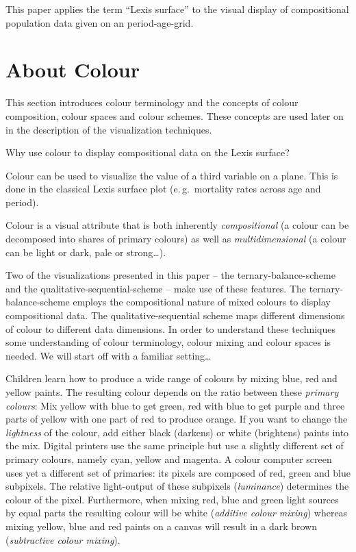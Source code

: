 \documentclass{scrartcl}
\begin{document}
This paper applies the term \enquote{Lexis surface} to the visual display of compositional population data given on an period-age-grid.

\clearpage

\section{About Colour} %
\label{sec:colour}

This section introduces colour terminology and the concepts of colour composition, colour spaces and colour schemes. These concepts are used later on in the description of the visualization techniques.

Why use colour to display compositional data on the Lexis surface?

\begin{compactenum}
  \item Colour can be used to visualize the value of a third variable on a plane. This is done in the classical Lexis surface plot (e.\,g.~mortality rates across age and period).
  \item Colour is a visual attribute that is both inherently \emph{compositional} (a colour can be decomposed into shares of primary colours) as well as \emph{multidimensional} (a colour can be light or dark, pale or strong\ldots).
\end{compactenum}

Two of the visualizations presented in this paper -- the ternary-balance-scheme and the qualitative-sequential-scheme -- make use of these features. The ternary-balance-scheme employs the compositional nature of mixed colours to display compositional data. The qualitative-sequential scheme maps different dimensions of colour to different data dimensions. In order to understand these techniques some understanding of colour terminology, colour mixing and colour spaces is needed. We will start off with a familiar setting\ldots

Children learn how to produce a wide range of colours by mixing blue, red and yellow paints. The resulting colour depends on the ratio between these \emph{primary colours}: Mix yellow with blue to get green, red with blue to get purple and three parts of yellow with one part of red to produce orange. If you want to change the \emph{lightness} of the colour, add either black (darkens) or white (brightens) paints into the mix. Digital printers use the same principle but use a slightly different set of primary colours, namely cyan, yellow and magenta. A colour computer screen uses yet a different set of primaries: its pixels are composed of red, green and blue subpixels. The relative light-output of these subpixels (\emph{luminance}) determines the colour of the pixel. Furthermore, when mixing red, blue and green light sources by equal parts the resulting colour will be white (\emph{additive colour mixing}) whereas mixing yellow, blue and red paints on a canvas will result in a dark brown (\emph{subtractive colour mixing}).
\end{document}
